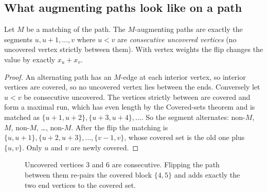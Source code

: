 \documentclass[11pt]{article}
\begin{document}
\subsection{What augmenting paths look like on a path}
\begin{theorembox}
Let $M$ be a matching of the path. The $M$-augmenting paths are exactly
the segments $u,u+1,\dots,v$ where $u<v$ are \emph{consecutive uncovered
vertices} (no uncovered vertex strictly between them). With vertex weights
the flip changes the value by exactly $x_u+x_v$.
\end{theorembox}
\begin{proof}
An alternating path has an $M$-edge at each interior vertex, so interior
vertices are covered, so no uncovered vertex lies between the ends.
Conversely let $u<v$ be consecutive uncovered. The vertices strictly
between are covered and form a maximal run, which has even length by the
Covered-sets theorem and is matched as $\{u+1,u+2\},\{u+3,u+4\},\dots$.
So the segment alternates: non-$M$, $M$, non-$M$, \dots, non-$M$. After the flip the
matching is $\{u,u+1\},\{u+2,u+3\},\dots,\{v-1,v\}$, whose covered set is
the old one plus $\{u,v\}$. Only $u$ and $v$ are newly covered.
\end{proof}

\begin{figure}[H]
\centering
{}
\caption{Uncovered vertices $3$ and $6$ are consecutive. Flipping the path
between them re-pairs the covered block $\{4,5\}$ and adds exactly the
two end vertices to the covered set.}\label{fig:augment}
\end{figure}
\end{document}

